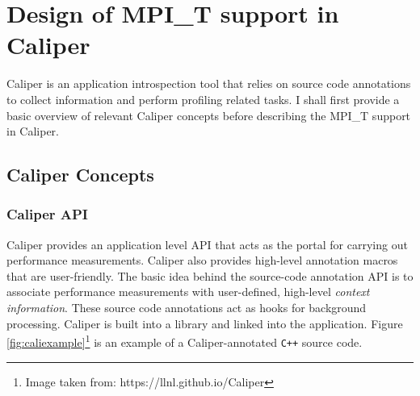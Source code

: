 \chapter{Design of MPI\_T support in Caliper}

Caliper is an application introspection tool that relies on source code annotations to collect information and perform profiling related tasks. I shall first provide a basic overview of relevant Caliper concepts before describing the MPI\_T support in Caliper. 

\section{Caliper Concepts}
\subsection{Caliper API}
Caliper provides an application level API that acts as the portal for carrying out performance measurements. Caliper also provides high-level annotation macros that are user-friendly. The basic idea behind the source-code annotation API is to associate performance measurements with user-defined, high-level \textit{context information}. These source code annotations act as hooks for background processing. Caliper is built into a library and linked into the application. Figure \ref{fig:caliexample}\footnote{Image taken from: https://llnl.github.io/Caliper} is an example of a Caliper-annotated \verb+C+\texttt{++} source code.
